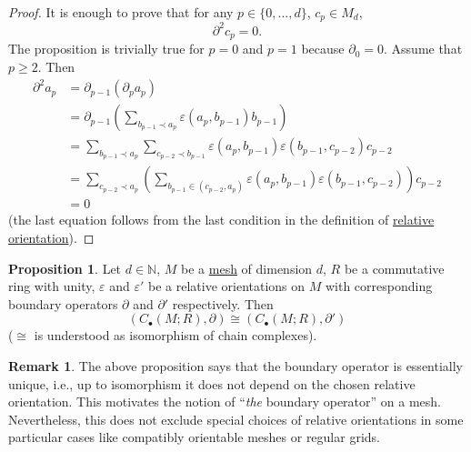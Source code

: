 \documentclass[fleqn]{article}
\theoremstyle{definition}
\newtheorem{proposition}[theorem]{Proposition}
\newtheorem{remark}[theorem]{Remark}
\newcommand{\N}{\mathbb{N}}
\begin{document}
\begin{proof}
  It is enough to prove that for any $p \in \{0, ..., d\}$, $c_p \in M_d$,
  \begin{equation}
    \partial^2 c_p = 0.
  \end{equation}
  The proposition is trivially true for $p = 0$ and $p = 1$
  because $\partial_0 = 0$.
  Assume that $p \geq 2$.
  Then
  \begin{equation}
    \begin{split}
      \partial^2 a_p
      & = \partial_{p - 1} (\partial_p a_p) \\
      & = \partial_{p - 1}
      \left(
        \sum_{b_{p - 1} \prec a_p} \varepsilon(a_p, b_{p - 1}) b_{p - 1}
      \right) \\
      & =
      \sum_{b_{p - 1} \prec a_p}
        \sum_{c_{p - 2} \prec b_{p - 1}}
            \varepsilon(a_p, b_{p - 1})
            \varepsilon(b_{p - 1}, c_{p - 2})
            c_{p - 2} \\
      & =
      \sum_{c_{p - 2} \prec a_p}
        \left(
          \sum _{b_{p - 1} \in (c_{p - 2}, a_p)}
            \varepsilon(a_p, b_{p - 1}) \varepsilon(b_{p - 1}, c_{p - 2})
        \right)
        c_{p - 2} \\
      & = 0
    \end{split}
  \end{equation}
  (the last equation follows from the last condition in the definition of
  \hyperref[idec:relative_orientation:definition]{relative orientation}).
\end{proof}

\begin{proposition}
  Let
    $d \in \N$,
    $M$ be a \hyperref[idec:mesh:definition]{mesh} of dimension $d$,
    $R$ be a commutative ring with unity,
    $\varepsilon$ and $\varepsilon'$ be a relative orientations on $M$
      with corresponding boundary operators
      $\partial$ and $\partial'$ respectively.
  Then
  \begin{equation}
    (C_\bullet(M; R), \partial) \cong (C_\bullet(M; R), \partial')
  \end{equation}
  ($\cong$ is understood as isomorphism of chain complexes).
\end{proposition}

\begin{remark}
  The above proposition says that the boundary operator is essentially unique,
  i.e., up to isomorphism it does not depend on the chosen relative orientation.
  This motivates the notion of ``\emph{the} boundary operator'' on a mesh.
  Nevertheless, this does not exclude special choices of relative orientations
  in some particular cases like compatibly orientable meshes or regular grids.
\end{remark}
\end{document}

